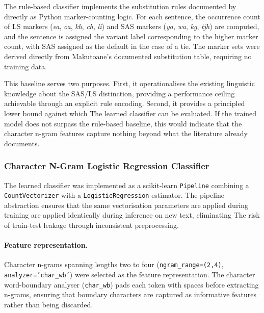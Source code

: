 \documentclass[11pt,a4paper]{article}
\begin{document}
The rule-based classifier implements the substitution rules documented by \citet{makutoane2022people} directly as Python
marker-counting logic. For each sentence, the occurrence count of LS
markers (\textit{ea}, \textit{oa}, \textit{kh}, \textit{ch},
\textit{li}) and SAS markers (\textit{ya}, \textit{wa},
\textit{kg}, \textit{tjh}) are computed, and the sentence is
assigned the variant label corresponding to the higher marker count,
with SAS assigned as the default in the case of a tie. The marker
sets were derived directly from Makutoane's documented substitution
table, requiring no training data.

This baseline serves two purposes. First, it operationalises the
existing linguistic knowledge about the SAS/LS distinction,
providing a performance ceiling achievable through an explicit rule
encoding. Second, it provides a principled lower bound against which
The learned classifier can be evaluated. If the trained model does
not surpass the rule-based baseline, this would indicate that the
character n-gram features capture nothing beyond what the literature
already documents.

\subsubsection{Character N-Gram Logistic Regression Classifier}
\label{sec:learned}

The learned classifier was implemented as a scikit-learn
\texttt{Pipeline} combining a \texttt{CountVectorizer} with a
\texttt{LogisticRegression} estimator. The pipeline abstraction
ensures that the same vectorisation parameters are applied during training
are applied identically during inference on new text, eliminating
The risk of train-test leakage through inconsistent preprocessing.

\paragraph{Feature representation.}
Character n-grams spanning lengths two to four
(\texttt{ngram\_range=(2,4)}, \texttt{analyzer='char\_wb'}) were
selected as the feature representation. The character word-boundary
analyser (\texttt{char\_wb}) pads each token with spaces before
extracting n-grams, ensuring that boundary characters are captured
as informative features rather than being discarded.
\end{document}
